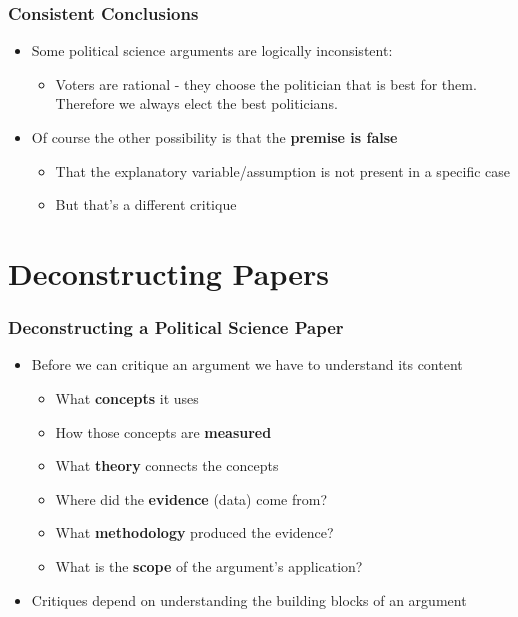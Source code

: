 \documentclass[xcolor=x11names,compress]{beamer}\usepackage[]{graphicx}\usepackage[]{xcolor}
\renewcommand{\(}{\begin{columns}}
\renewcommand{\)}{\end{columns}}
\newcommand{\<}[1]{\begin{column}{#1}}
\renewcommand{\>}{\end{column}}
\begin{document}
\begin{frame}
\frametitle{Consistent Conclusions}
\begin{itemize}
\item Some political science arguments are logically inconsistent:
\begin{itemize}
\item Voters are rational - they choose the politician that is best for them. Therefore we always elect the best politicians.
\end{itemize}
\pause
\item Of course the other possibility is that the \textbf{premise is false}
\begin{itemize}
\item That the explanatory variable/assumption is not present in a specific case
\item But that's a different critique
\end{itemize}
\end{itemize}
\end{frame}

\section{Deconstructing Papers}

\begin{frame}
\frametitle{Deconstructing a Political Science Paper}
\begin{itemize}
\item Before we can critique an argument we have to understand its content
\pause
\begin{itemize}
\item What \textbf{concepts} it uses
\pause
\item How those concepts are \textbf{measured}
\pause
\item What \textbf{theory} connects the concepts
\pause
\item Where did the \textbf{evidence} (data) come from?
\pause
\item What \textbf{methodology} produced the evidence?
\pause
\item What is the \textbf{scope} of the argument's application?
\end{itemize}
\item Critiques depend on understanding the building blocks of an argument
\end{itemize}
\end{frame}
\end{document}

